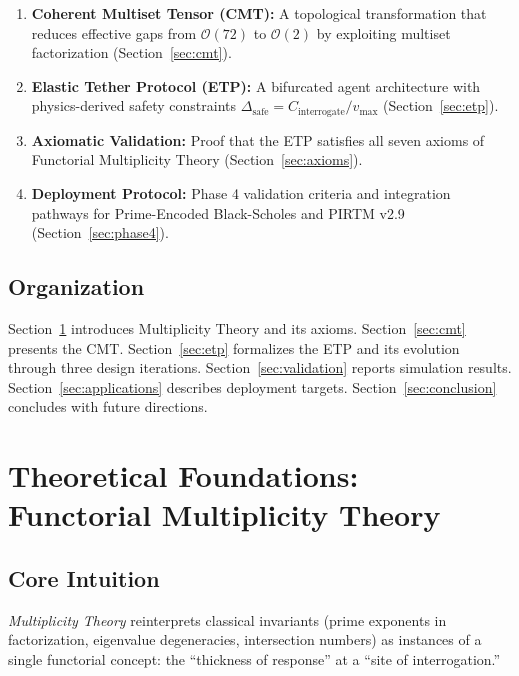 \documentclass[12pt,a4paper]{article}
\begin{document}
\begin{enumerate}
\item \textbf{Coherent Multiset Tensor (CMT):} A topological transformation that reduces effective gaps from $\mathcal{O}(72)$ to $\mathcal{O}(2)$ by exploiting multiset factorization (Section~\ref{sec:cmt}).

\item \textbf{Elastic Tether Protocol (ETP):} A bifurcated agent architecture with physics-derived safety constraints $\Delta_{\text{safe}} = C_{\text{interrogate}} / v_{\max}$ (Section~\ref{sec:etp}).

\item \textbf{Axiomatic Validation:} Proof that the ETP satisfies all seven axioms of Functorial Multiplicity Theory (Section~\ref{sec:axioms}).

\item \textbf{Deployment Protocol:} Phase 4 validation criteria and integration pathways for Prime-Encoded Black-Scholes and PIRTM v2.9 (Section~\ref{sec:phase4}).
\end{enumerate}

\subsection{Organization}

Section~\ref{sec:foundations} introduces Multiplicity Theory and its axioms. Section~\ref{sec:cmt} presents the CMT. Section~\ref{sec:etp} formalizes the ETP and its evolution through three design iterations. Section~\ref{sec:validation} reports simulation results. Section~\ref{sec:applications} describes deployment targets. Section~\ref{sec:conclusion} concludes with future directions.

\section{Theoretical Foundations: Functorial Multiplicity Theory}
\label{sec:foundations}

\subsection{Core Intuition}

\textit{Multiplicity Theory} reinterprets classical invariants (prime exponents in factorization, eigenvalue degeneracies, intersection numbers) as instances of a single functorial concept: the ``thickness of response'' at a ``site of interrogation.''
\end{document}
